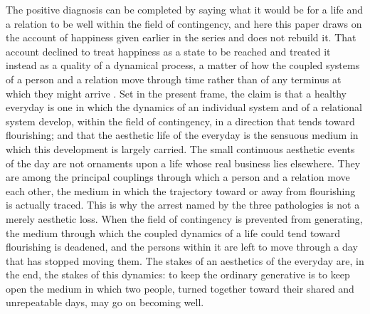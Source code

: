 The positive diagnosis can be completed by saying what it would be for a life and a relation to be well within the field of contingency, and here this paper draws on the account of happiness given earlier in the series and does not rebuild it. That account declined to treat happiness as a state to be reached and treated it instead as a quality of a dynamical process, a matter of how the coupled systems of a person and a relation move through time rather than of any terminus at which they might arrive \parencite{paperxix}. Set in the present frame, the claim is that a healthy everyday is one in which the dynamics of an individual system and of a relational system develop, within the field of contingency, in a direction that tends toward flourishing; and that the aesthetic life of the everyday is the sensuous medium in which this development is largely carried. The small continuous aesthetic events of the day are not ornaments upon a life whose real business lies elsewhere. They are among the principal couplings through which a person and a relation move each other, the medium in which the trajectory toward or away from flourishing is actually traced. This is why the arrest named by the three pathologies is not a merely aesthetic loss. When the field of contingency is prevented from generating, the medium through which the coupled dynamics of a life could tend toward flourishing is deadened, and the persons within it are left to move through a day that has stopped moving them. The stakes of an aesthetics of the everyday are, in the end, the stakes of this dynamics: to keep the ordinary generative is to keep open the medium in which two people, turned together toward their shared and unrepeatable days, may go on becoming well.
